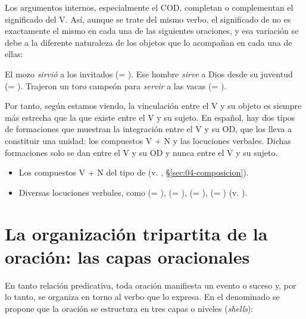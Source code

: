 \begin{recuadro}
Los argumentos internos, especialmente el COD, completan o complementan el
significado del V. Así, aunque se trate del mismo verbo, el significado de
 no es exactamente el mismo en cada una de las siguientes
oraciones, y esa variación se debe a la diferente naturaleza de los objetos que
lo acompañan en cada una de ellas:

\begin{exe}
  \ex El mozo \textit{sirvió} a los invitados (= ).
  \ex Ese hombre \textit{sirve} a Dios desde su juventud (= ).
  \ex Trajeron un toro campeón para \textit{servir} a las vacas (=
      ).
\end{exe}

Por tanto, según estamos viendo, la vinculación entre el V y su objeto es
siempre más estrecha que la que existe entre el V y su sujeto. En español, hay
dos tipos de formaciones que muestran la integración entre el V y su OD, que los
lleva a constituir una unidad: los compuestos V + N y las locuciones verbales.
Dichas formaciones solo se dan entre el V y su OD y nunca entre el V y su
sujeto.

\begin{itemize}
  \item Los compuestos V + N del tipo de  (v.
        , §\ref{sec:04-composicion}).
  \item Diversas locuciones verbales, como  (=
        ),  (= ),  (= ),  (=
        ) (v. ).
\end{itemize}
\end{recuadro}

\section{La organización tripartita de la oración: las capas oracionales}\label{sec:06-capas}

En tanto relación predicativa, toda oración manifiesta un evento o suceso y,
por lo tanto, se organiza en torno al verbo que lo expresa. En el denominado
 \parencite{rizzi1995} se propone que la oración
se estructura en tres capas o niveles (\textit{shells}):

